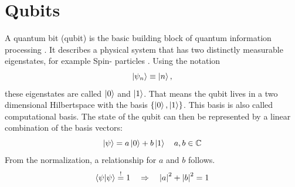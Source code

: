 \section{Qubits}
	A quantum bit (qubit) is the basic building block of quantum information processing \cite{Aeschbacher2020-tr}.
	It describes a physical system that has two distinctly measurable eigenstates, for example Spin- particles \cite{levy2002universal}.
	Using the notation
	\begin{equation}
		\label{eq:rename_statevector}
		\ket{\psi_n} \equiv \ket{n},
	\end{equation}
	these eigenstates are called $\ket{0}$ and $\ket{1}$. That means the qubit lives in a two dimensional Hilbertspace with the basis $\{\ket{0},\ket{1}\}$. This basis is also called computational basis. The state of the qubit can then be represented by a linear combination of the basis vectors:
	\begin{equation}
		\label{eq:qubit_superposition}
		\ket{\psi}=a\ket{0}+b\ket{1} \quad a,b \in \mathbb{C}
	\end{equation}
	From the normalization, a relationship for $a$ and $b$ follows.
	\begin{equation}
		\label{eq:normalize_condition_qubit}
		\braket{\psi}{\psi}\stackrel{!}{=}1 \quad \Rightarrow \quad \abs{a}^2+\abs{b}^2=1
	\end{equation}
